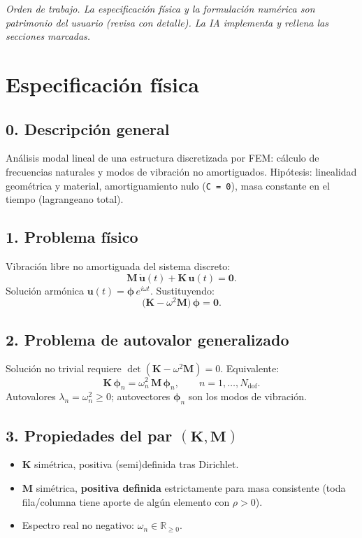 \documentclass[11pt,letterpaper,oneside]{report}
\begin{document}
\textit{Orden de trabajo. La especificación física y la formulación numérica son patrimonio del usuario (revisa con detalle). La IA implementa y rellena las secciones marcadas.}



\section{Especificación física}

\subsection{0. Descripción general}
Análisis modal lineal de una estructura discretizada por FEM: cálculo de frecuencias naturales y modos de vibración no amortiguados. Hipótesis: linealidad geométrica y material, amortiguamiento nulo (\texttt{C = 0}), masa constante en el tiempo (lagrangeano total).

\subsection{1. Problema físico}
Vibración libre no amortiguada del sistema discreto:
\[
\mathbf M\,\ddot{\mathbf u}(t) + \mathbf K\,\mathbf u(t) = \mathbf 0.
\]
Solución armónica $\mathbf u(t) = \boldsymbol\phi\, e^{i\omega t}$. Sustituyendo:
\[
\bigl(\mathbf K - \omega^2 \mathbf M\bigr)\,\boldsymbol\phi = \mathbf 0.
\]

\subsection{2. Problema de autovalor generalizado}
Solución no trivial requiere $\det(\mathbf K - \omega^2 \mathbf M) = 0$. Equivalente:
\[
\mathbf K\,\boldsymbol\phi_n = \omega_n^2\, \mathbf M\,\boldsymbol\phi_n, \qquad n = 1, \ldots, N_{\text{dof}}.
\]
Autovalores $\lambda_n = \omega_n^2 \ge 0$; autovectores $\boldsymbol\phi_n$ son los modos de vibración.

\subsection{3. Propiedades del par $(\mathbf K, \mathbf M)$}
\begin{itemize}
  \item $\mathbf K$ simétrica, positiva (semi)definida tras Dirichlet.
  \item $\mathbf M$ simétrica, \textbf{positiva definida} estrictamente para masa consistente (toda fila/columna tiene aporte de algún elemento con $\rho > 0$).
  \item Espectro real no negativo: $\omega_n \in \mathbb R_{\ge 0}$.
\end{itemize}
\end{document}

